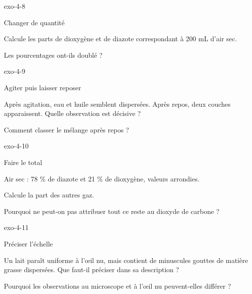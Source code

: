 \documentclass[12pt,twoside,openany]{book}
\begin{document}
\begin{blocLivre}{exo-4-8}
\begin{exercice}[2]{Changer de quantité}
\begin{questions}
\item Calcule les parts de dioxygène et de diazote correspondant à 200 mL d’air sec.
\item Les pourcentages ont-ils doublé ?
\end{questions}
\end{exercice}\end{blocLivre}
\begin{blocLivre}{exo-4-9}
\begin{exercice}[2]{Agiter puis laisser reposer}
\begin{questions}
\item Après agitation, eau et huile semblent dispersées. Après repos, deux couches apparaissent. Quelle observation est décisive ?
\item Comment classer le mélange après repos ?
\end{questions}
\end{exercice}\end{blocLivre}
\begin{blocLivre}{exo-4-10}
\begin{exercice}[2]{Faire le total}
\begin{donnees}Air sec : 78 \% de diazote et 21 \% de dioxygène, valeurs arrondies.\par
\end{donnees}
\begin{questions}
\item Calcule la part des autres gaz.
\item Pourquoi ne peut-on pas attribuer tout ce reste au dioxyde de carbone ?
\end{questions}
\end{exercice}\end{blocLivre}
\begin{blocLivre}{exo-4-11}
\begin{exercice}[2]{Préciser l’échelle}
\begin{questions}
\item Un lait paraît uniforme à l’œil nu, mais contient de minuscules gouttes de matière grasse dispersées. Que faut-il préciser dans sa description ?
\item Pourquoi les observations au microscope et à l’œil nu peuvent-elles différer ?
\end{questions}
\end{exercice}\end{blocLivre}
\end{document}
